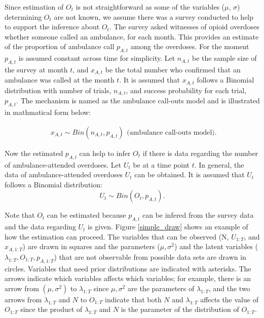 \documentclass[12pt]{article}
\begin{document}
{ 
Since estimation of $O_t$ is not straightforward as some of the variables ($\mu$, $\sigma$) determining $O_t$ are not known, we assume there was a survey conducted to help to support the inference about  $O_t$. The survey asked witnesses of opioid overdoses whether someone called an ambulance, for each month. This provides an estimate of the proportion of ambulance call $p_{A,t}$ among the overdoses. For the moment $p_{A,t}$ is assumed constant across time for simplicity. Let $n_{A,t}$ be the sample size of the survey at month $t$, and $x_{A,t}$ be the total number who confirmed that an ambulance was called at the month $t$. It is assumed that $x_{A,t}$ follows a Binomial distribution with number of trials, $n_{A,t}$, and  success probability for each trial, $p_{A,t}$. The mechanism is named as the ambulance call-outs model and is illustrated in mathmatical form below:

\begin{equation}
\label{ambulance}
\left.\begin{aligned}
x_{A,t} \sim Bin(n_{A,t},p_{A,t})\end{aligned}\right.
\text{(ambulance call-outs model).}
\end{equation}

Now the estimated $p_{A,t}$ can help to infer $O_t$ if there is data regarding the number of  ambulance-attended overdoses. Let \(U_t\) be at a time point $t$. In general, the data of ambulance-attended overdoses \(U_t\) can be obtained. It is assumed that  \(U_t\) follows a Binomial distribution: 
\begin{equation}
\label{over_amb}
\left.
U_t \sim Bin(O_t, p_{A,t}).
\right.
\end{equation}

Note that $O_t$ can be estimated because $p_{A,t}$ can be infered from the survey data and the data regarding $U_t$ is given. Figure \ref{simple_draw} shows an example of how the estimation can proceed. The variables that can be observed (N, $U_{1:T}$, and $x_{A,1:T}$) are drawn in squares and the parameters ($\mu, \sigma^2$) and the latent variables ($\lambda_{1:T}, O_{1:T}, p_{A,1:T} $) that are not observable from possible data sets are drawn in circles. Variables that need prior distributions are indicated with asterisks. The arrows indicate which variables affects which variables; for example, there is an arrow from $(\mu, \sigma^2)$ to $\lambda_{1:T}$ since $\mu, \sigma^2$ are the parameters of $\lambda_{1:T}$, and the two arrows from  $\lambda_{1:T}$ and $N$ to $O_{1:T}$ indicate that both $N$ and $\lambda_{1:T}$ affects the value of $O_{1:T}$ since the product of $\lambda_{1:T}$ and $N$ is the parameter of the distribution of $O_{1:T}$.\\

}
\end{document}
